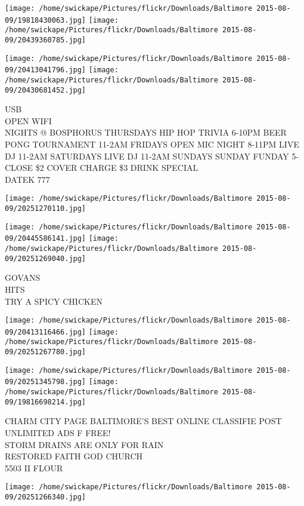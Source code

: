 \documentclass[10pt,letterpaper]{article}
\begin{document}
\texttt{[image: /home/swickape/Pictures/flickr/Downloads/Baltimore 2015-08-09/19818430063.jpg]}
\texttt{[image: /home/swickape/Pictures/flickr/Downloads/Baltimore 2015-08-09/20439360785.jpg]}

\texttt{[image: /home/swickape/Pictures/flickr/Downloads/Baltimore 2015-08-09/20413041796.jpg]}
\texttt{[image: /home/swickape/Pictures/flickr/Downloads/Baltimore 2015-08-09/20430681452.jpg]}

USB\\
OPEN WIFI\\
NIGHTS @ BOSPHORUS THURSDAYS HIP HOP TRIVIA 6{-}10PM BEER PONG TOURNAMENT 11{-}2AM FRIDAYS OPEN MIC NIGHT 8{-}11PM LIVE DJ 11{-}2AM SATURDAYS LIVE DJ 11{-}2AM SUNDAYS SUNDAY FUNDAY 5{-}CLOSE \$2 COVER CHARGE \$3 DRINK SPECIAL\\
DATEK 777
\pagebreak

\texttt{[image: /home/swickape/Pictures/flickr/Downloads/Baltimore 2015-08-09/20251270110.jpg]}

\vspace{0.25in}
\texttt{[image: /home/swickape/Pictures/flickr/Downloads/Baltimore 2015-08-09/20445586141.jpg]}
\texttt{[image: /home/swickape/Pictures/flickr/Downloads/Baltimore 2015-08-09/20251269040.jpg]}

GOVANS\\
HITS\\
TRY A SPICY CHICKEN
\pagebreak

\texttt{[image: /home/swickape/Pictures/flickr/Downloads/Baltimore 2015-08-09/20413116466.jpg]}
\texttt{[image: /home/swickape/Pictures/flickr/Downloads/Baltimore 2015-08-09/20251267780.jpg]}

\texttt{[image: /home/swickape/Pictures/flickr/Downloads/Baltimore 2015-08-09/20251345798.jpg]}
\texttt{[image: /home/swickape/Pictures/flickr/Downloads/Baltimore 2015-08-09/19816698214.jpg]}

CHARM CITY PAGE BALTIMORE'S BEST ONLINE CLASSIFIE POST UNLIMITED ADS F FREE!\\
STORM DRAINS ARE ONLY FOR RAIN\\
RESTORED FAITH GOD CHURCH\\
5503 II FLOUR
\pagebreak

\texttt{[image: /home/swickape/Pictures/flickr/Downloads/Baltimore 2015-08-09/20251266340.jpg]}
\end{document}
